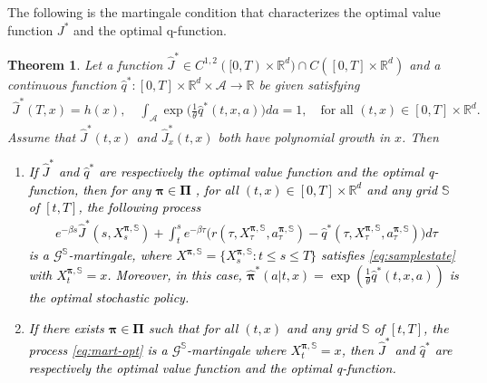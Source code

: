 \documentclass[11pt]{article}
\newtheorem{theorem}{Theorem}
\newcommand{\1}{\mathbbm{1}}
\newcommand{\rev}[1]{\textcolor{black}{{#1}}} %
\begin{document}
The following is  the martingale condition that characterizes the optimal value function $J^*$ and the optimal q-function.
\begin{theorem}\label{thm:opt-mart}
Let a function $\hat J^* \in C^{1,2}([0,T)\times\mathbb{R}^d)\cap C([0,T]\times\mathbb{R}^d)$ and a continuous function $\hat q^*: [0, T] \times \mathbb{R}^d \times \mathcal{A} \rightarrow \mathbb{R}$ be given satisfying
\begin{align} \label{eq:boundary}
	\hat J^*(T, x) = h (x), \quad \int_{\mathcal{A} } {\exp \Big( \frac{1}{\theta} \hat q^*(t,x,a) \Big) da} = 1, \quad \text{for all $(t,x) \in [0, T] \times \mathbb{R}^d $}.
\end{align}
Assume that $\hat J^*(t,x)$ and $\hat J^*_x(t,x)$ both have polynomial growth in $x$.
Then
\begin{enumerate}
	\item [(i)] \rev{If $\hat J^*$ and $\hat q^*$ are respectively the optimal value function and the optimal q-function,  then for any $\boldsymbol{\pi} \in \boldsymbol{\Pi}$ , for all
	$(t,x) \in [0, T] \times \mathbb{R}^d $ and any grid $\mathbb{S}$ of $[t,T]$, the following process
	\begin{align} \label{eq:mart-opt}
		e^{-\beta s} \hat J^*(s, X_s^{ \boldsymbol{\pi}, \mathbb{S}}) +    \int_t^s e^{-\beta \tau } \big( r(\tau, X_{\tau}^{\boldsymbol{\pi}, \mathbb{S}}, a_{\tau}^{\boldsymbol{\pi}, \mathbb{S}}) - \hat q^* (\tau, X_{\tau}^{\boldsymbol{\pi} , \mathbb{S}}, a_{\tau}^{\boldsymbol{\pi}, \mathbb{S}})\big) d\tau
	\end{align}
	is a $\mathcal{G}^{\mathbb{S}}$-martingale, where $X^{\boldsymbol{\pi}, \mathbb{S}} = \{X^{\boldsymbol{\pi}, \mathbb{S}}_s: t \le s \le T\}$ satisfies \eqref{eq:samplestate}  with $X^{\boldsymbol{\pi}, \mathbb{S}}_t =x$. Moreover, in this case, $\boldsymbol{\hat \pi}^*(a|t,x) =  \exp(\frac{1}{\theta} \hat q^*(t,x,a))$ is the optimal stochastic policy.}
	
	
	\item [(ii)]  \rev{ If there exists $\boldsymbol{\pi} \in \boldsymbol{\Pi}$ such that for all $(t,x)$ and any grid $\mathbb{S}$ of $[t,T]$, the process \eqref{eq:mart-opt} is a $\mathcal{G}^{\mathbb{S}}$-martingale where $X^{\boldsymbol{\pi}, \mathbb{S}}_t=x$, then $\hat J^*$ and $\hat q^*$ are respectively the optimal value function and the optimal q-function.}
\end{enumerate}
\end{theorem}
\end{document}
